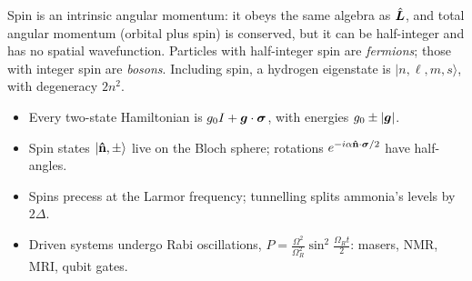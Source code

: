 \begin{fact}
Spin is an intrinsic angular momentum: it obeys the same algebra as $\hat{\bm{L}}$, and total angular momentum (orbital plus spin) is conserved, but it can be half-integer and has no spatial wavefunction. Particles with half-integer spin are \emph{fermions}; those with integer spin are \emph{bosons}. Including spin, a hydrogen eigenstate is $|n,\ell,m,s\rangle$, with degeneracy $2n^2$.
\end{fact}

\begin{fact}
\leavevmode
\begin{itemize}
\item Every two-state Hamiltonian is $g_0I + \bm{g}\cdot\bm{\sigma}$, with energies $g_0\pm|\bm{g}|$.
\item Spin states $|\boldsymbol{\hat{\textbf{n}}},\pm\rangle$ live on the Bloch sphere; rotations $e^{-i\alpha\boldsymbol{\hat{\textbf{n}}}\cdot\bm{\sigma}/2}$ have half-angles.
\item Spins precess at the Larmor frequency; tunnelling splits ammonia's levels by $2\Delta$.
\item Driven systems undergo Rabi oscillations, $P = \frac{\Omega^2}{\Omega_R^2}\sin^2\frac{\Omega_Rt}{2}$: masers, NMR, MRI, qubit gates.
\end{itemize}
\end{fact}
